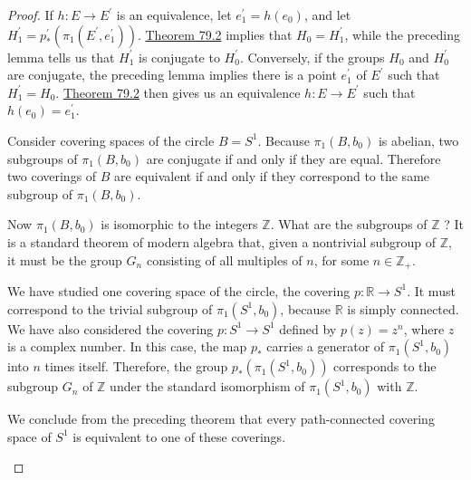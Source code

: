 \begin{proof}
	If \(h : E \rightarrow {E}^{\prime }\) is an equivalence, let \(e_1^{\prime } = h( e_{0})\), and let \(H_1^{\prime } = p_{ * }^{\prime }( {{\pi }_{1}( {E^{\prime },e_1^{\prime }}) })\). \hyperref[thm:79.2]{Theorem 79.2} implies that \(H_{0} = H_1^{\prime }\), while the preceding lemma tells us that \(H_1^{\prime }\) is conjugate to \(H_0^{\prime }\).
Conversely, if the groups \(H_{0}\) and \(H_0^{\prime }\) are conjugate, the preceding lemma implies there is a point \(e_1^{\prime }\) of \(E^{\prime }\) such that \(H_1^{\prime } = H_{0}\). \hyperref[thm:79.2]{Theorem 79.2} then gives us an equivalence \(h : E \rightarrow {E}^{\prime }\) such that \(h( e_{0}) = e_1^{\prime }\).

\begin{centeredblock}
\begin{example}
\label{ex:\thesection.\theexample}
	Consider covering spaces of the circle \(B = S^{1}\). Because \({\pi }_{1}( {B,b_{0}})\) is abelian, two subgroups of \({\pi }_{1}( {B,b_{0}})\) are conjugate if and only if they are equal. Therefore two coverings of \(B\) are equivalent if and only if they correspond to the same subgroup of \({\pi }_{1}( {B,b_{0}})\).

Now \({\pi }_{1}( {B,b_{0}})\) is isomorphic to the integers \(\mathbb{Z}\). What are the subgroups of \(\mathbb{Z}\) ? It is a standard theorem of modern algebra that, given a nontrivial subgroup of \(\mathbb{Z}\), it must be the group \(G_{n}\) consisting of all multiples of \(n\), for some \(n \in {\mathbb{Z}}_{ + }\).

We have studied one covering space of the circle, the covering \(p : \mathbb{R} \rightarrow {S}^{1}\). It must correspond to the trivial subgroup of \({\pi }_{1}( {S^{1},b_{0}})\), because \(\mathbb{R}\) is simply connected. We have also considered the covering \(p : S^{1} \rightarrow {S}^{1}\) defined by \(p( z) = z^{n}\), where \(z\) is a complex number. In this case, the map \(p_{ * }\) carries a generator of \({\pi }_{1}( {S^{1},b_{0}})\) into \(n\) times itself. Therefore, the group \(p_{ * }( {{\pi }_{1}( {S^{1},b_{0}}) })\) corresponds to the subgroup \(G_{n}\) of \(\mathbb{Z}\) under the standard isomorphism of \({\pi }_{1}( {S^{1},b_{0}})\) with \(\mathbb{Z}\).

We conclude from the preceding theorem that every path-connected covering space of \(S^{1}\) is equivalent to one of these coverings.
\end{example}
\end{centeredblock}
\end{proof}
